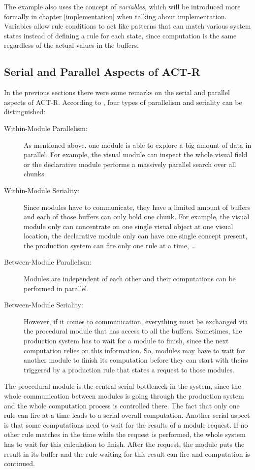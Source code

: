 The example also uses the concept of \emph{variables}, which will be introduced more formally in chapter \ref{implementation} when talking about implementation. Variables allow rule conditions to act like patterns that can match various system states instead of defining a rule for each state, since computation is the same regardless of the actual values in the buffers.

\subsection{Serial and Parallel Aspects of ACT-R}
\label{serial_parallel_aspects}

In the previous sections there were some remarks on the serial and parallel aspects of ACT-R. According to \cite[p. 68]{anderson_how_2007}, four types of parallelism and seriality can be distinguished:

\enlargethispage{\baselineskip}

\begin{description}
 \item[Within-Module Parallelism:] As mentioned above, one module is able to explore a big amount of data in parallel. For example, the visual module can inspect the whole visual field or the declarative module performs a massively parallel search over all chunks.
 \item[Within-Module Seriality:] Since modules have to communicate, they have a limited amount of buffers and each of those buffers can only hold one chunk. For example, the visual module only can concentrate on one single visual object at one visual location, the declarative module only can have one single concept present, the production system can fire only one rule at a time, \dots 
 \item[Between-Module Parallelism:] Modules are independent of each other and their computations can be performed in parallel.
 \item[Between-Module Seriality:] However, if it comes to communication, everything must be exchanged via the procedural module that has access to all the buffers. Sometimes, the production system has to wait for a module to finish, since the next computation relies on this information. So, modules may have to wait for another module to finish its computation before they can start with theirs triggered by a production rule that states a request to those modules.
\end{description}

The procedural module is the central serial bottleneck in the system, since the whole communication between modules is going through the production system and the whole computation process is controlled there. The fact that only one rule can fire at a time leads to a serial overall computation. Another serial aspect is that some computations need to wait for the results of a module request. If no other rule matches in the time while the request is performed, the whole system has to wait for this calculation to finish. After the request, the module puts the result in its buffer and the rule waiting for this result can fire and computation is continued.


